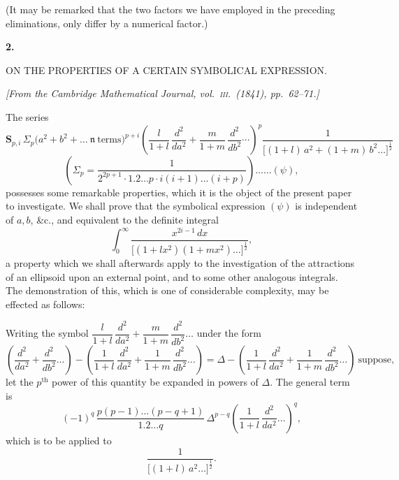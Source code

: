 \documentclass[11pt]{article}
\begin{document}
\medskip

(It may be remarked that the two factors we have employed in the preceding eliminations, only differ by a numerical factor.)

\clearpage


\begin{center}
{\Large\textbf{2.}}\par
\bigskip
{\Large ON THE PROPERTIES OF A CERTAIN SYMBOLICAL EXPRESSION.}
\end{center}

\medskip
\begin{center}
\textit{[From the Cambridge Mathematical Journal, vol.\ \textsc{iii}.\ (1841), pp.~62--71.]}
\end{center}

\bigskip

\noindent The series
\[
\mathbf{S}_{p,i}\,\Sigma_{p}\bigl(a^2 + b^2 + \ldots\ \mathfrak{n}\ \text{terms}\bigr)^{p+i}
\left(\frac{l}{1+l}\,\frac{d^2}{da^2} + \frac{m}{1+m}\,\frac{d^2}{db^2}\cdots\right)^{p}
\frac{1}{\bigl[(1+l)\,a^2 + (1+m)\,b^2 \ldots\bigr]^{\frac{1}{2}}}
\]
\[
\left(\Sigma_{p} = \frac{1}{2^{2p+1}\cdot 1.2\ldots p\cdot i(i+1)\ldots(i+p)}\right) \ldots\ldots (\psi),
\]
possesses some remarkable properties, which it is the object of the present paper to investigate. We shall prove that the symbolical expression $(\psi)$ is independent of $a, b$, \&c., and equivalent to the definite integral
\[
\int_{0}^{\infty} \frac{x^{2i-1}\,dx}{\bigl[(1 + lx^2)(1 + mx^2)\ldots\bigr]^{\frac{1}{2}}},
\]
a property which we shall afterwards apply to the investigation of the attractions of an ellipsoid upon an external point, and to some other analogous integrals. The demonstration of this, which is one of considerable complexity, may be effected as follows:

Writing the symbol $\dfrac{l}{1+l}\,\dfrac{d^2}{da^2} + \dfrac{m}{1+m}\,\dfrac{d^2}{db^2}\ldots$ under the form
\[
\left(\frac{d^2}{da^2} + \frac{d^2}{db^2}\ldots\right) - \left(\frac{1}{1+l}\,\frac{d^2}{da^2} + \frac{1}{1+m}\,\frac{d^2}{db^2}\ldots\right) = \Delta - \left(\frac{1}{1+l}\,\frac{d^2}{da^2} + \frac{1}{1+m}\,\frac{d^2}{db^2}\ldots\right)\ \text{suppose,}
\]
let the $p^{\text{th}}$ power of this quantity be expanded in powers of $\Delta$. The general term is
\[
(-1)^{q}\,\frac{p(p-1)\ldots(p-q+1)}{1.2\ldots q}\,\Delta^{p-q}\left(\frac{1}{1+l}\,\frac{d^2}{da^2}\ldots\right)^{q},
\]
which is to be applied to
\[
\frac{1}{\bigl[(1+l)\,a^2 \ldots\bigr]^{\frac{1}{2}}}.
\]
\end{document}
